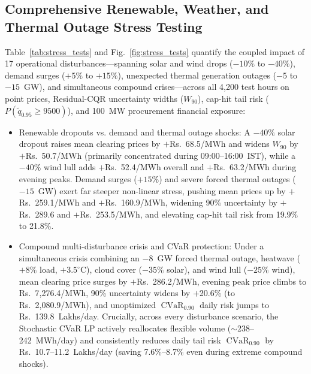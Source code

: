\documentclass[runningheads,a4paper]{llncs}
\begin{document}
\subsection{Comprehensive Renewable, Weather, and Thermal Outage Stress Testing}
Table~\ref{tab:stress_tests} and Fig.~\ref{fig:stress_tests} quantify the coupled impact of 17 operational disturbances---spanning solar and wind drops ($-10\%$ to $-40\%$), demand surges ($+5\%$ to $+15\%$), unexpected thermal generation outages ($-5$ to $-15$~GW), and simultaneous compound crises---across all 4,200 test hours on point prices, Residual-CQR uncertainty widths ($W_{90}$), cap-hit tail risk ($P(\tilde{q}_{0.95} \ge 9500)$), and 100~MW procurement financial exposure:
\begin{itemize}
    \item Renewable dropouts vs. demand and thermal outage shocks: A $-40\%$ solar dropout raises mean clearing prices by $+$Rs.~68.5/MWh and widens $W_{90}$ by $+$Rs.~50.7/MWh (primarily concentrated during 09:00--16:00~IST), while a $-40\%$ wind lull adds $+$Rs.~52.4/MWh overall and $+$Rs.~63.2/MWh during evening peaks. Demand surges ($+15\%$) and severe forced thermal outages ($-15$~GW) exert far steeper non-linear stress, pushing mean prices up by $+$Rs.~259.1/MWh and $+$Rs.~160.9/MWh, widening 90\% uncertainty by $+$Rs.~289.6 and $+$Rs.~253.5/MWh, and elevating cap-hit tail risk from 19.9\% to 21.8\%.
    \item Compound multi-disturbance crisis and CVaR protection: Under a simultaneous crisis combining an $-8$~GW forced thermal outage, heatwave ($+8\%$ load, $+3.5^\circ\text{C}$), cloud cover ($-35\%$ solar), and wind lull ($-25\%$ wind), mean clearing price surges by $+$Rs.~286.2/MWh, evening peak price climbs to Rs.~7,276.4/MWh, 90\% uncertainty widens by $+$20.6\% (to Rs.~2,080.9/MWh), and unoptimized $\operatorname{CVaR}_{0.90}$ daily risk jumps to Rs.~139.8~Lakhs/day. Crucially, across every disturbance scenario, the Stochastic CVaR LP actively reallocates flexible volume ($\sim$238--242~MWh/day) and consistently reduces daily tail risk $\operatorname{CVaR}_{0.90}$ by Rs.~10.7--11.2~Lakhs/day (saving 7.6\%--8.7\% even during extreme compound shocks).
\end{itemize}
\end{document}
